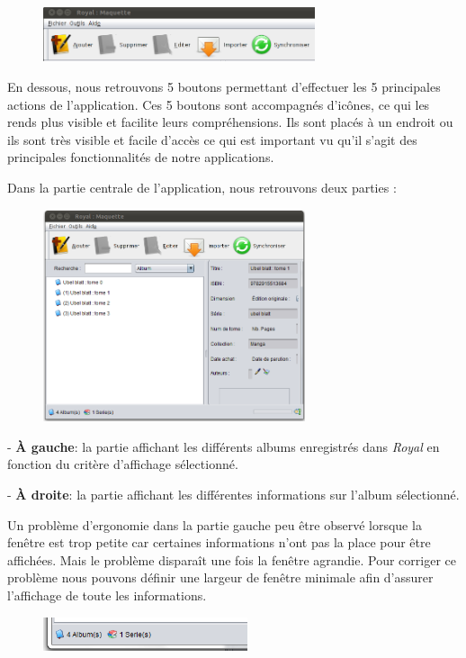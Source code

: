 \documentclass[etudiants]{support-iutrs}
\begin{document}
\begin{figure}
\includegraphics[width=8cm]{img/app_pc_maquette_btn.png}
\end{figure}

En dessous, nous retrouvons 5 boutons permettant d'effectuer les 5 principales actions de l'application. 
Ces 5 boutons sont accompagnés d’icônes, ce qui les rends plus visible et facilite leurs compréhensions.
Ils sont placés à un endroit ou ils sont très visible et facile d'accès ce qui est important vu qu'il s'agit des principales fonctionnalités de notre applications.

Dans la partie centrale de l'application, nous retrouvons deux parties :

\begin{figure}
\includegraphics[width=7.7cm]{img/app_pc_maquette2.png}
\end{figure}
- \textbf{À gauche}: la partie affichant les différents albums enregistrés dans \emph{Royal} en fonction du critère d'affichage sélectionné. 

- \textbf{À droite}: la partie affichant les différentes informations sur l'album sélectionné.

Un problème d'ergonomie dans la partie gauche peu être observé lorsque la fenêtre est trop petite car certaines informations n'ont pas la place pour être affichées. 
Mais le problème disparaît une fois la fenêtre agrandie. 
Pour corriger ce problème nous pouvons définir une largeur de fenêtre minimale afin d'assurer l’affichage de toute les informations. 

\begin{figure}
\includegraphics[width=6cm]{img/app_pc_maquette_bas.png}
\end{figure}
\end{document}
